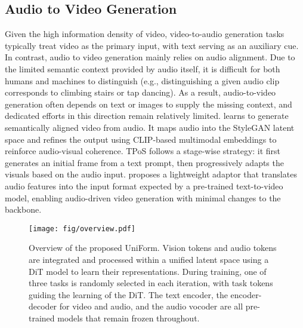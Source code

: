 \subsection{Audio to Video Generation}
Given the high information density of video, video-to-audio generation tasks typically treat video as the primary input, with text serving as an auxiliary cue. In contrast, audio to video generation mainly relies on audio alignment. Due to the limited semantic context provided by audio itself, it is difficult for both humans and machines to distinguish (e.g., distinguishing a given audio clip corresponds to climbing stairs or tap dancing). As a result, audio-to-video generation often depends on text or images to supply the missing context, and dedicated efforts in this direction remain relatively limited. \cite{lee2022sound} learns to generate semantically aligned video from audio. It maps audio into the StyleGAN latent space and refines the output using CLIP-based multimodal embeddings to reinforce audio-visual coherence. TPoS \cite{jeong2023power} follows a stage-wise strategy: it first generates an initial frame from a text prompt, then progressively adapts the visuals based on the audio input. \cite{yariv2024diverse} proposes a lightweight adaptor that translates audio features into the input format expected by a pre-trained text-to-video model, enabling audio-driven video generation with minimal changes to the backbone.

\begin{figure*}[t]
    \centering
    \texttt{[image: fig/overview.pdf]}
    \caption{Overview of the proposed UniForm. Vision tokens and audio tokens are integrated and processed within a unified latent space using a DiT model to learn their representations. During training, one of three tasks is randomly selected in each iteration, with task tokens guiding the learning of the DiT. The text encoder, the encoder-decoder for video and audio, and the audio vocoder are all pre-trained models that remain frozen throughout.}
    \label{fig:overview}
\end{figure*}

